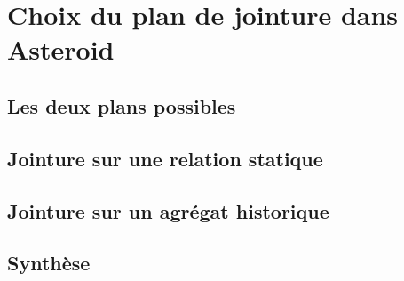 \section{Choix du plan de jointure dans Asteroid}\label{sec:valid:perfs:couplage}
\subsection{Les deux plans possibles}
\subsection{Jointure sur une relation statique}
\subsection{Jointure sur un agrégat historique}
\subsection{Synthèse}
